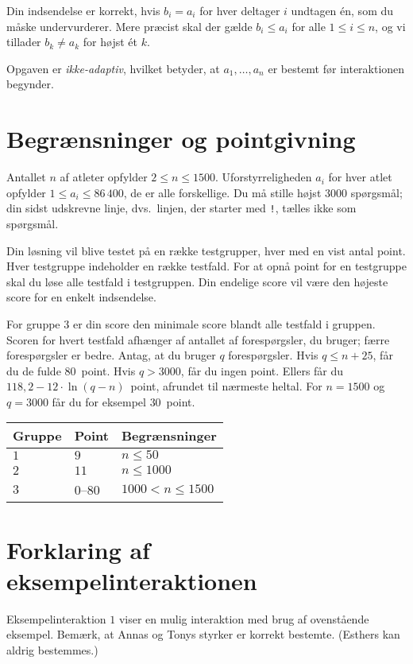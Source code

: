 Din indsendelse er korrekt, hvis $b_i=a_i$ for hver deltager $i$ undtagen én, som du måske undervurderer.
Mere præcist skal der gælde $b_i\leq a_i$ for alle $1\leq i\leq n$, og vi tillader $b_k \neq a_k$ for højst ét $k$.


Opgaven er \emph{ikke-adaptiv}, hvilket betyder, at $a_1,\ldots, a_n$ er bestemt før interaktionen begynder.

\section*{Begrænsninger og pointgivning}

Antallet $n$ af atleter opfylder
$2\leq n\leq 1500$. %
Uforstyrreligheden $a_i$ for hver atlet opfylder
$1\leq a_i\leq 86\,400$, %
de er alle forskellige. %
Du må stille
højst $3000$ spørgsmål; %
din sidst udskrevne linje, dvs.\ linjen, der starter med \texttt{!}, tælles ikke som spørgsmål.

Din løsning vil blive testet på en række testgrupper, hver med en vist antal point.
Hver testgruppe indeholder en række testfald.
For at opnå point for en testgruppe skal du løse alle testfald i testgruppen.
Din endelige score vil være den højeste score for en enkelt indsendelse.

For gruppe $3$ er din score den minimale score blandt alle testfald i gruppen.
Scoren for hvert testfald afhænger af antallet af forespørgsler, du bruger;
færre forespørgsler er bedre.
Antag, at du bruger $q$ forespørgsler.
Hvis $q \le n+25$, får du de fulde $80$~point.
Hvis $q > 3000$, får du ingen point.
Ellers får du
$118,2 - 12 \cdot \ln(q - n)$~point, afrundet til nærmeste heltal. %
For $n = 1500$ og $q = 3000$ får du for eksempel $30$~point.

\medskip
\begin{tabular}{lll}
Gruppe & Point & Begrænsninger\\\hline
$1$ & $9$ & $n\leq 50$\\
$2$ & $11$ & $n\leq 1000$\\
$3$ & $0$--$80$ & $1000 < n\leq 1500$
\end{tabular}

\section*{Forklaring af eksempelinteraktionen}

Eksempelinteraktion $1$ viser en mulig interaktion med brug af ovenstående eksempel.
Bemærk, at Annas og Tonys styrker er korrekt bestemte.
(Esthers kan aldrig bestemmes.)
